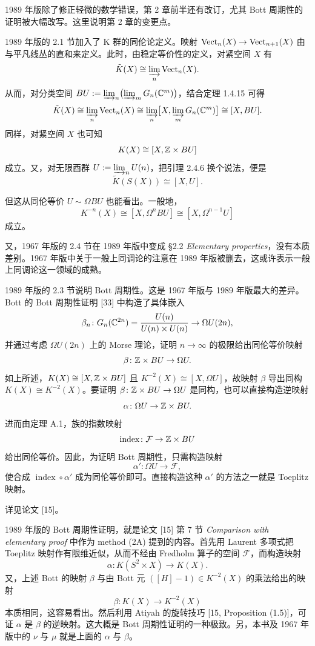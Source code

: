 1989 年版除了修正轻微的数学错误，第 2 章前半还有改订，尤其 Bott 周期性的证明被大幅改写。这里说明第 2 章的变更点。

1989 年版的 2.1 节加入了 K 群的同伦论定义。映射 $\operatorname{Vect}_{n}(X)\to\operatorname{Vect}_{n+1}(X)$ 由与平凡线丛的直和来定义。此时，由稳定等价性的定义，对紧空间 $X$ 有
\[
  \tilde K(X)\cong\varinjlim_{n}\operatorname{Vect}_{n}(X).
\]
从而，对分类空间 $BU:=\varinjlim_{n}\bigl(\varinjlim_{m}G_{n}(\mathbb{C}^{m})\bigr)$，结合定理 1.4.15 可得
\[
  \tilde K(X)\cong\varinjlim_{n}\operatorname{Vect}_{n}(X)\cong\varinjlim_{n}\bigl[X,\varinjlim_{m}G_{n}(\mathbb{C}^{m})\bigr]\cong[X,BU].
\]
同样，对紧空间 $X$ 也可知
\[
  K(X)\cong[X,\mathbb{Z}\times BU]
\]
成立。又，对无限酉群 $U:=\varinjlim_{n}U(n)$，把引理 2.4.6 换个说法，便是
\[
  \tilde K(S(X))\cong[X,U].
\]

但这从同伦等价 $U\sim\Omega BU$ 也能看出。一般地，
\[
  K^{-n}(X)\cong[X,\Omega^{n}BU]\cong[X,\Omega^{n-1}U]
\]
成立。

又，1967 年版的 2.4 节在 1989 年版中变成 §2.2 \textit{Elementary properties}，没有本质差别。1967 年版中关于一般上同调论的注意在 1989 年版被删去，这或许表示一般上同调论这一领域的成熟。

1989 年版的 2.3 节说明 Bott 周期性。这是 1967 年版与 1989 年版最大的差异。Bott 的 Bott 周期性证明 [33] 中构造了具体嵌入
\[
  \beta_{n}\colon G_{n}(\mathbb{C}^{2n})=\frac{U(n)}{U(n)\times U(n)}\to\Omega U(2n),
\]
并通过考虑 $\Omega U(2n)$ 上的 Morse 理论，证明 $n\to\infty$ 的极限给出同伦等价映射
\[
  \beta\colon\mathbb{Z}\times BU\to\Omega U.
\]
如上所述，$K(X)\cong[X,\mathbb{Z}\times BU]$ 且 $K^{-2}(X)\cong[X,\Omega U]$，故映射 $\beta$ 导出同构 $K(X)\cong K^{-2}(X)$。要证明 $\beta\colon\mathbb{Z}\times BU\to\Omega U$ 是同构，也可以直接构造逆映射
\[
  \alpha\colon\Omega U\to\mathbb{Z}\times BU.
\]
进而由定理 A.1，族的指数映射
\[
  \operatorname{index}\colon\mathcal{F}\to\mathbb{Z}\times BU
\]
给出同伦等价。因此，为证明 Bott 周期性，只需构造映射
\[
  \alpha'\colon\Omega U\to\mathcal{F},
\]
使合成 $\operatorname{index}\circ\alpha'$ 成为同伦等价即可。直接构造这种 $\alpha'$ 的方法之一就是 Toeplitz 映射。

详见论文 [15]。

1989 年版的 Bott 周期性证明，就是论文 [15] 第 7 节 \textit{Comparison with elementary proof} 中作为 method (2A) 提到的内容。首先用 Laurent 多项式把 Toeplitz 映射作有限维近似，从而不经由 Fredholm 算子的空间 $\mathcal{F}$，而构造映射
\[
  \alpha\colon K(S^{2}\times X)\to K(X).
\]
又，上述 Bott 的映射 $\beta$ 与由 Bott 元 $([H]-1)\in K^{-2}(X)$ 的乘法给出的映射
\[
  \beta\colon K(X)\to K^{-2}(X)
\]
本质相同，这容易看出。然后利用 Atiyah 的旋转技巧 [15, Proposition (1.5)]，可证 $\alpha$ 是 $\beta$ 的逆映射。这大概是 Bott 周期性证明的一种极致。另，本书及 1967 年版中的 $\nu$ 与 $\mu$ 就是上面的 $\alpha$ 与 $\beta$。

